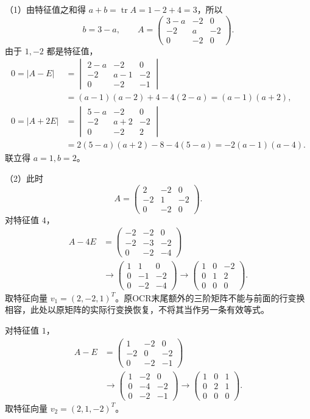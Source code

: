 \documentclass[11pt,fontset=fandol]{ctexart}
\begin{document}
（1）由特征值之和得 \(a+b=\operatorname{tr}A=1-2+4=3\)，所以 \[
b=3-a,\qquad A=\begin{pmatrix}3-a&-2&0\\-2&a&-2\\0&-2&0\end{pmatrix}.
\] 由于 \(1,-2\) 都是特征值， \[
\begin{aligned}
0=|A-E|&=\begin{vmatrix}2-a&-2&0\\-2&a-1&-2\\0&-2&-1\end{vmatrix}\\
&=(a-1)(a-2)+4-4(2-a)=(a-1)(a+2),\\
0=|A+2E|&=\begin{vmatrix}5-a&-2&0\\-2&a+2&-2\\0&-2&2\end{vmatrix}\\
&=2(5-a)(a+2)-8-4(5-a)=-2(a-1)(a-4).
\end{aligned}
\] 联立得 \(a=1,b=2\)。

（2）此时 \[
A=\begin{pmatrix}2&-2&0\\-2&1&-2\\0&-2&0\end{pmatrix}.
\] 对特征值 \(4\)， \[
\begin{aligned}
A-4E&=\begin{pmatrix}-2&-2&0\\-2&-3&-2\\0&-2&-4\end{pmatrix}\\
&\longrightarrow\begin{pmatrix}1&1&0\\0&-1&-2\\0&-2&-4\end{pmatrix}
\longrightarrow\begin{pmatrix}1&0&-2\\0&1&2\\0&0&0\end{pmatrix}.
\end{aligned}
\] 取特征向量
\(v_1=(2,-2,1)^T\)。原OCR末尾额外的三阶矩阵不能与前面的行变换相容，此处以原矩阵的实际行变换恢复，不将其当作另一条有效等式。

对特征值 \(1\)， \[
\begin{aligned}
A-E&=\begin{pmatrix}1&-2&0\\-2&0&-2\\0&-2&-1\end{pmatrix}\\
&\longrightarrow\begin{pmatrix}1&-2&0\\0&-4&-2\\0&-2&-1\end{pmatrix}
\longrightarrow\begin{pmatrix}1&0&1\\0&2&1\\0&0&0\end{pmatrix}.
\end{aligned}
\] 取特征向量 \(v_2=(2,1,-2)^T\)。
\end{document}
